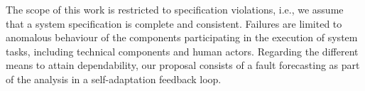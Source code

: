 
The scope of this work is restricted to specification violations, i.e., we assume that a system specification is complete and consistent. Failures are limited to anomalous behaviour of the components participating in the execution of system tasks, including technical components and human actors. Regarding the different means to attain dependability, our proposal consists of a fault forecasting as part of the analysis in a self-adaptation feedback loop.


